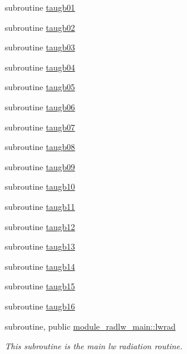 \begin{DoxyCompactItemize}
subroutine \hyperlink{group__module__radlw__main_ga001d1bcd17533f7f920f859ff9a4e60f}{taugb01}
\item 
subroutine \hyperlink{radlw__main_8f_a926415cb51870dda9a90883e01a2ee38}{taugb02}
\item 
subroutine \hyperlink{radlw__main_8f_a45e39b507d1fc031c80d9c7f06905d4a}{taugb03}
\item 
subroutine \hyperlink{radlw__main_8f_ae69174bcf1a87dc7a5baffac69797d07}{taugb04}
\item 
subroutine \hyperlink{radlw__main_8f_a92653ffcd20ff247a00eaf3339cba6df}{taugb05}
\item 
subroutine \hyperlink{radlw__main_8f_a7190d415614aa35deefacff1041d4719}{taugb06}
\item 
subroutine \hyperlink{radlw__main_8f_a2208d86ae0712a0ca426bbe96de825bc}{taugb07}
\item 
subroutine \hyperlink{radlw__main_8f_a1447d5bda5b521d27171e61881684183}{taugb08}
\item 
subroutine \hyperlink{radlw__main_8f_a889abbaaa2d421c0c3dc820e2004414d}{taugb09}
\item 
subroutine \hyperlink{radlw__main_8f_a74c1cb8390daff1e5ce5e863c50b7873}{taugb10}
\item 
subroutine \hyperlink{radlw__main_8f_a573fd5b3580d6bbf5bfa2f01ee547034}{taugb11}
\item 
subroutine \hyperlink{radlw__main_8f_ae56eaa9e3b897ca235d4d6b271cc1e47}{taugb12}
\item 
subroutine \hyperlink{radlw__main_8f_a2ac7254d2dcff516e8e44b8b679302c0}{taugb13}
\item 
subroutine \hyperlink{radlw__main_8f_a26140cbe1a3d6119b56cf5c2d539670e}{taugb14}
\item 
subroutine \hyperlink{radlw__main_8f_a93b5c0ae0525697ffffb6228581a301c}{taugb15}
\item 
subroutine \hyperlink{radlw__main_8f_a942ce0031745cd1b3b4ebc3915970554}{taugb16}
\end{DoxyCompactItemize}
{\bf }\par
\begin{DoxyCompactItemize}
\item 
subroutine, public \hyperlink{group__module__radlw__main_gacff9ff756859e9abcd3905c7725fdff3}{module\+\_\+radlw\+\_\+main\+::lwrad}
\begin{DoxyCompactList}\small\item\em This subroutine is the main lw radiation routine. \end{DoxyCompactList}\end{DoxyCompactItemize}

